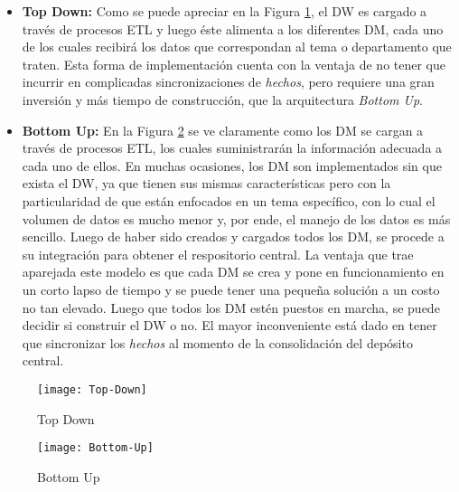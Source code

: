 \documentclass[a4paper,11pt]{article}
\begin{document}
    \begin{itemize}
      \item \textbf{Top Down:} Como se puede apreciar en la Figura \ref{top_down}, el DW es cargado a través de procesos ETL y luego éste alimenta a los
      diferentes DM, cada uno de los cuales recibirá los datos que correspondan al tema o departamento que traten. Esta forma de implementación cuenta
      con la ventaja de no tener que incurrir en complicadas sincronizaciones de \textit{hechos}, pero requiere una gran inversión y más tiempo de
      construcción, que la arquitectura \textit{Bottom Up}.
      \item \textbf{Bottom Up:} En la Figura \ref{bottom_up} se ve claramente como los DM se cargan a través de procesos ETL, los cuales suministrarán la
      información adecuada a cada uno de ellos. En muchas ocasiones, los DM son implementados sin que exista el DW, ya que tienen sus mismas 
      características pero con la particularidad de que están enfocados en un tema específico, con lo cual el volumen de datos es mucho menor y, por ende,
      el manejo de los datos es más sencillo. Luego de haber sido creados y cargados todos los DM, se procede a su integración para obtener el
      respositorio central. La ventaja que trae aparejada este modelo es que cada DM se crea y pone en funcionamiento en un corto lapso de tiempo y se
      puede tener una pequeña solución a un costo no tan elevado. Luego que todos los DM estén puestos en marcha, se puede decidir si construir el DW o no.
      El mayor inconveniente está dado en tener que sincronizar los \textit{hechos} al momento de la consolidación del depósito central.
    \end{itemize}
    
    \begin{figure}
      \begin{center}
        \texttt{[image: Top-Down]}
        \caption{Top Down} \cite[p.~74]{hefestov2}
        \label{top_down}
      \end{center}
    \end{figure}
    
    \begin{figure}
      \begin{center}
        \texttt{[image: Bottom-Up]}
        \caption{Bottom Up} \cite[p.~74]{hefestov2}
        \label{bottom_up}
      \end{center}
    \end{figure}
    
\end{document}
